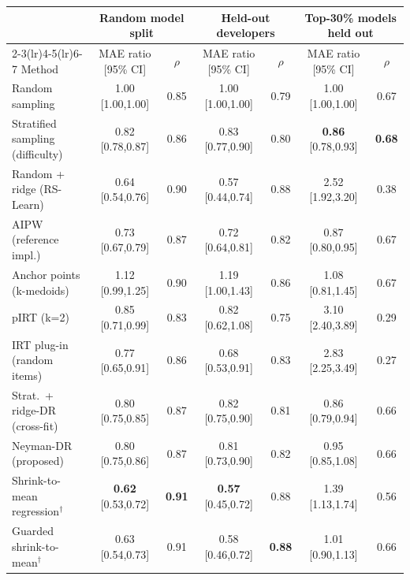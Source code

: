 \begin{tabular}{l cc cc cc}
\toprule
 & \multicolumn{2}{c}{Random model split} & \multicolumn{2}{c}{Held-out developers} & \multicolumn{2}{c}{Top-30\% models held out}\\
\cmidrule(lr){2-3}\cmidrule(lr){4-5}\cmidrule(lr){6-7}
Method & MAE ratio [95\% CI] & $\rho$ & MAE ratio [95\% CI] & $\rho$ & MAE ratio [95\% CI] & $\rho$ \\
\midrule
Random sampling & 1.00 {\scriptsize[1.00,1.00]} & 0.85 & 1.00 {\scriptsize[1.00,1.00]} & 0.79 & 1.00 {\scriptsize[1.00,1.00]} & 0.67 \\
Stratified sampling (difficulty) & 0.82 {\scriptsize[0.78,0.87]} & 0.86 & 0.83 {\scriptsize[0.77,0.90]} & 0.80 & \textbf{0.86} {\scriptsize[0.78,0.93]} & \textbf{0.68} \\
Random + ridge (RS-Learn) & 0.64 {\scriptsize[0.54,0.76]} & 0.90 & 0.57 {\scriptsize[0.44,0.74]} & 0.88 & 2.52 {\scriptsize[1.92,3.20]} & 0.38 \\
AIPW (reference impl.) & 0.73 {\scriptsize[0.67,0.79]} & 0.87 & 0.72 {\scriptsize[0.64,0.81]} & 0.82 & 0.87 {\scriptsize[0.80,0.95]} & 0.67 \\
Anchor points (k-medoids) & 1.12 {\scriptsize[0.99,1.25]} & 0.90 & 1.19 {\scriptsize[1.00,1.43]} & 0.86 & 1.08 {\scriptsize[0.81,1.45]} & 0.67 \\
pIRT (k=2) & 0.85 {\scriptsize[0.71,0.99]} & 0.83 & 0.82 {\scriptsize[0.62,1.08]} & 0.75 & 3.10 {\scriptsize[2.40,3.89]} & 0.29 \\
IRT plug-in (random items) & 0.77 {\scriptsize[0.65,0.91]} & 0.86 & 0.68 {\scriptsize[0.53,0.91]} & 0.83 & 2.83 {\scriptsize[2.25,3.49]} & 0.27 \\
Strat.\ + ridge-DR (cross-fit) & 0.80 {\scriptsize[0.75,0.85]} & 0.87 & 0.82 {\scriptsize[0.75,0.90]} & 0.81 & 0.86 {\scriptsize[0.79,0.94]} & 0.66 \\
Neyman-DR (proposed) & 0.80 {\scriptsize[0.75,0.86]} & 0.87 & 0.81 {\scriptsize[0.73,0.90]} & 0.82 & 0.95 {\scriptsize[0.85,1.08]} & 0.66 \\
Shrink-to-mean regression$^\dagger$ & \textbf{0.62} {\scriptsize[0.53,0.72]} & \textbf{0.91} & \textbf{0.57} {\scriptsize[0.45,0.72]} & 0.88 & 1.39 {\scriptsize[1.13,1.74]} & 0.56 \\
Guarded shrink-to-mean$^\dagger$ & 0.63 {\scriptsize[0.54,0.73]} & 0.91 & 0.58 {\scriptsize[0.46,0.72]} & \textbf{0.88} & 1.01 {\scriptsize[0.90,1.13]} & 0.66 \\
\bottomrule
\end{tabular}
